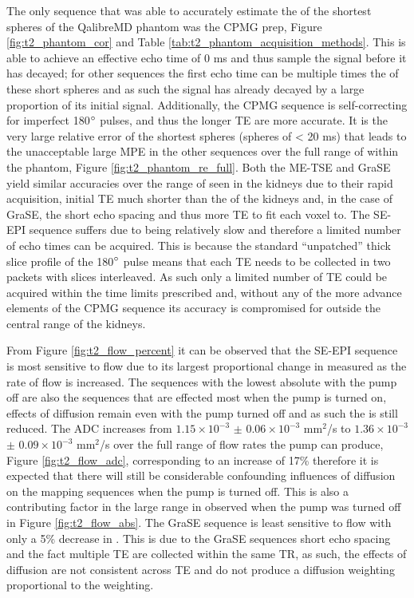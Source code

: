 The only sequence that was able to accurately estimate the \ttwo of the shortest \ttwo spheres of the QalibreMD phantom was the \ac{CPMG} \ttwo prep, Figure \ref{fig:t2_phantom_cor} and Table \ref{tab:t2_phantom_acquisition_methods}. This is able to achieve an effective echo time of 0 ms and thus sample the signal before it has decayed; for other sequences the first echo time can be multiple times the \ttwo of these short spheres and as such the signal has already decayed by a large proportion of its initial signal. Additionally, the \ac{CPMG} sequence is self-correcting for imperfect 180$\degree$ pulses, and thus the longer \ac{TE} are more accurate. It is the very large relative error of the shortest \ttwo spheres (spheres of \ttwo < 20 ms) that leads to the unacceptable large \ac{MPE} in the other sequences over the full range of \ttwo within the phantom, Figure \ref{fig:t2_phantom_re_full}. Both the \ac{ME-TSE} and \ac{GraSE} yield similar accuracies over the range of \ttwo seen in the kidneys due to their rapid acquisition, initial \ac{TE} much shorter than the \ttwo of the kidneys and, in the case of \ac{GraSE}, the short echo spacing  and thus more \ac{TE} to fit each voxel to. The \ac{SE}-\ac{EPI} sequence suffers due to being relatively slow and therefore a limited number of echo times can be acquired. This is because the standard ``unpatched'' thick slice profile of the 180$\degree$ pulse means that each \ac{TE} needs to be collected in two packets with slices interleaved. As such only a limited number of \ac{TE} could be acquired within the time limits prescribed and, without any of the more advance elements of the \ac{CPMG} sequence its accuracy is compromised for \ttwo outside the central range of the kidneys. 

From Figure \ref{fig:t2_flow_percent} it can be observed that the \ac{SE}-\ac{EPI} sequence is most sensitive to flow due to its largest proportional change in measured \ttwo as the rate of flow is increased.  The sequences with the lowest absolute \ttwo with the pump off are also the sequences that are effected most when the pump is turned on, effects of diffusion remain even with the pump turned off and as such the \ttwo is still reduced. The \ac{ADC} increases from $1.15\times 10^{-3}$ $\pm$ $0.06\times 10^{-3}$ mm$^2$/s to $1.36\times 10^{-3}$ $\pm$ $0.09\times 10^{-3}$ mm$^2$/s over the full range of flow rates the pump can produce, Figure \ref{fig:t2_flow_adc}, corresponding to an increase of 17\% therefore it is expected that there will still be considerable confounding influences of diffusion on the \ttwo mapping sequences when the pump is turned off. This is also a contributing factor in the large range in \ttwo observed when the pump was turned off in Figure \ref{fig:t2_flow_abs}. The \ac{GraSE} sequence is least sensitive to flow with only a 5\% decrease in \ttwo. This is due to the \ac{GraSE} sequences short echo spacing and the fact multiple \ac{TE} are collected within the same \ac{TR}, as such, the effects of diffusion are not consistent across \ac{TE} and do not produce a diffusion weighting proportional to the \ttwo weighting.

